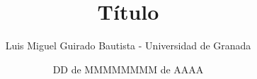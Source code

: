 \documentclass{article}
\title{Título}
\author{Luis Miguel Guirado Bautista - Universidad de Granada}
\date{DD de MMMMMMMM de AAAA}
\begin{document}
    \begin{titlepage}
        \maketitle
    \end{titlepage}

    \pagebreak

    \tableofcontents

    \pagebreak 
\end{document}
